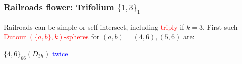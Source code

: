 \documentclass{beamer}
\begin{document}
\begin{frame}\frametitle{Railroads flower: Trifolium   
$\{1,3\}_1$}
\vspace{-2mm}
Railroads can be simple or self-intersect, including 
\textcolor{red}{triply} if $k=3$.
First such \textcolor{red}{Dutour $(\{a,b\},k)$-spheres} for 
$(a,b)=(4,6), (5,6)$ are: 
\begin{center}
\begin{minipage}{4.5cm}
\centering
{}\par
$\{4,6\}_{66}(D_{3h})$ \textcolor{blue}{twice}
\end{minipage}
\begin{minipage}{4.5cm}
\centering
{}\par

\end{minipage}
\end{center}
\end{frame}
\end{document}
